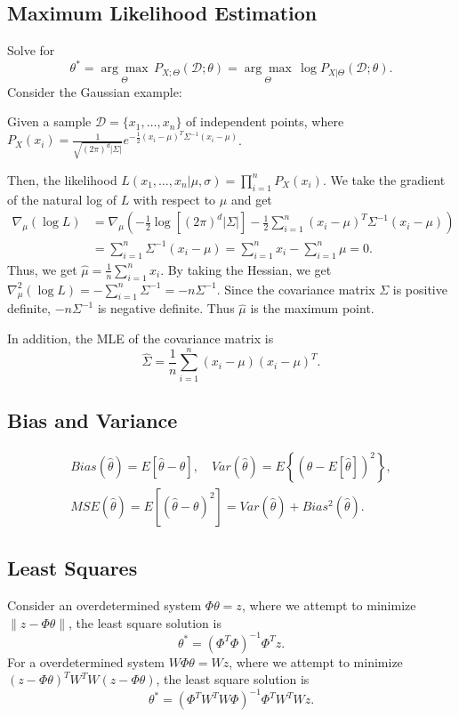 \documentclass{article}
\newenvironment{topic}[1]{\subsection*{#1}}{}
\newcommand*{\D}{\mathcal{D}}
\begin{document}
\begin{topic}{Maximum Likelihood Estimation}
    Solve for
    \[
        \theta^* = \underset{\Theta}{\arg \max} \, P_{X;\Theta}(\D;\theta) = \underset{\Theta}{\arg \max} \, \log P_{X|\Theta}(\D;\theta).
    \]
    Consider the Gaussian example: 
    
    Given a sample $\D = \{x_1, \dots , x_n\}$ of independent points, where $P_X(x_i) = \frac{1}{\sqrt{(2\pi)^d|\Sigma|}}e^{-\frac{1}{2}(x_i - \mu)^T\Sigma^{-1}(x_i - \mu)}$.

    Then, the likelihood $L(x_1, \dots, x_n|\mu, \sigma) = \prod_{i = 1}^n P_X(x_i)$.
    We take the gradient of the natural log of $L$ with respect to $\mu$ and get
    \begin{align*}
        \nabla_{\mu} (\log L) 
        &= \nabla_{\mu} \left(-\frac{1}{2}\log[(2\pi)^d|\Sigma|] - \frac{1}{2} \sum_{i = 1}^n (x_i - \mu)^T\Sigma^{-1}(x_i - \mu)\right) \\
        &= \sum_{i = 1}^n \Sigma^{-1}(x_i - \mu) = \sum_{i = 1}^n x_i - \sum_{i = 1}^n \mu  = 0.
    \end{align*}
    Thus, we get $\hat{\mu} = \frac{1}{n}\sum_{i = 1}^n x_i$. 
    By taking the Hessian, we get $\nabla_{\mu}^2(\log L) = -\sum_{i = 1}^n \Sigma^{-1} = -n\Sigma^{-1}$.
    Since the covariance matrix $\Sigma$ is positive definite, $-n\Sigma^{-1}$ is negative definite. Thus $\hat{\mu}$ is the maximum point.

    In addition, the MLE of the covariance matrix is
    \[
        \hat{\Sigma} = \frac{1}{n}\sum_{i = 1}^n (x_i - \mu)(x_i - \mu)^T.
    \]
\end{topic}

\begin{topic}{Bias and Variance}
    \begin{gather*}
        Bias(\hat{\theta}) = E[\hat{\theta} - \theta], \quad Var(\hat{\theta}) = E\left\{(\hat{\theta} - E[\hat{\theta}])^2\right\}, \\
        MSE(\hat{\theta}) = E\left[(\hat{\theta} - \theta)^2\right] = Var(\hat{\theta}) + Bias^2(\hat{\theta}).
    \end{gather*}
\end{topic}

\begin{topic}{Least Squares}
    Consider an overdetermined system $\Phi\theta = z$, where we attempt to minimize $\lVert z - \Phi\theta \rVert$, the least square solution is
    \[
        \theta^* = (\Phi^T\Phi)^{-1}\Phi^Tz.
    \]
    For a overdetermined system $W\Phi\theta = Wz$, where we attempt to minimize $(z - \Phi\theta)^TW^TW(z - \Phi\theta)$, the least square solution is
    \[
        \theta^* = (\Phi^TW^TW\Phi)^{-1}\Phi^TW^TWz.
    \]
\end{topic}
\end{document}
